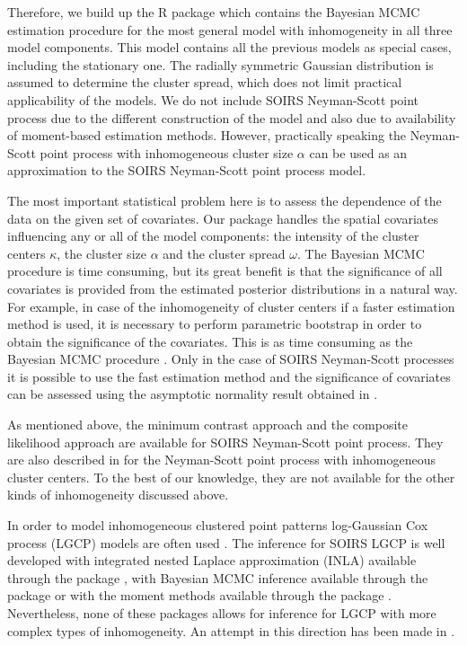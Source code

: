 Therefore, we build up the R package  which contains the Bayesian MCMC estimation procedure for the most general model with inhomogeneity in all three model components. This model contains all the previous models as special cases, including the stationary one. The radially symmetric Gaussian distribution is assumed to determine the cluster spread, which does not limit practical applicability of the models. We do not include SOIRS Neyman-Scott point process due to the different construction of the model and also due to availability of moment-based estimation methods. However, practically speaking the Neyman-Scott point process with inhomogeneous cluster size $\alpha$ can be used as an approximation to the SOIRS Neyman-Scott point process model.

The most important statistical problem here is to assess the dependence of the data on the given set of covariates. Our package handles the spatial covariates influencing any or all of the model components: the intensity of the cluster centers $\kappa$, the cluster size $\alpha$ and the cluster spread $\omega$. The Bayesian MCMC procedure is time consuming, but its great benefit is that the significance of all covariates is provided from the estimated posterior distributions in a natural way. For example, in case of the inhomogeneity of cluster centers if a faster estimation method is used, it is necessary to perform parametric bootstrap in order to obtain the significance of the covariates. This is as time consuming as the Bayesian MCMC procedure \citep{MMK2014}. Only in the case of SOIRS Neyman-Scott processes it is possible to use the fast estimation method and the significance of covariates can be assessed using the asymptotic normality result obtained in \citet{WG2009}.

As mentioned above, the minimum contrast approach and the composite likelihood approach are available for SOIRS Neyman-Scott point process. They are also described in \citet{MMK2014} for the Neyman-Scott point process with inhomogeneous cluster centers. To the best of our knowledge, they are not available for the other kinds of inhomogeneity discussed above. 

In order to model inhomogeneous clustered point patterns log-Gaussian Cox process (LGCP) models are often used \citep{MSW1998}. The inference for SOIRS LGCP is well developed with integrated nested Laplace approximation (INLA) \citep{RMCh2009} available through the package  \citep{inlabru}, with Bayesian MCMC inference available through the package  \citep{lgcp} or with the moment methods available through the package . Nevertheless, none of these packages allows for inference for LGCP with more complex types of inhomogeneity. An attempt in this direction has been made in \cite{Dvoraketal2019}.

